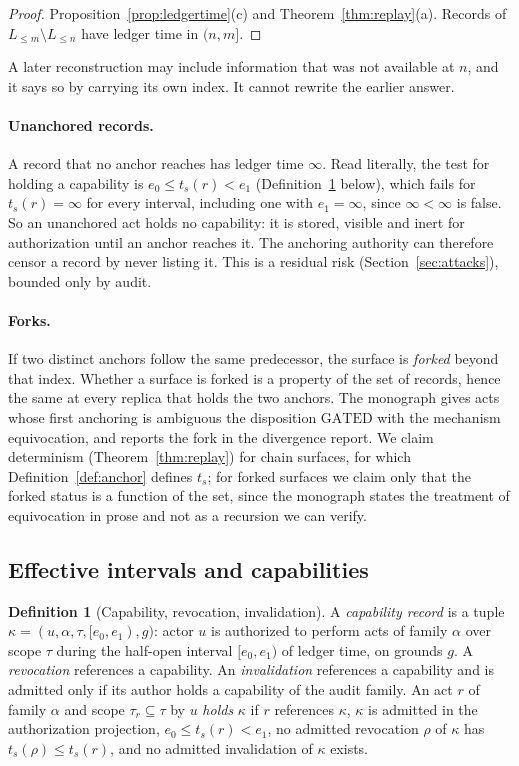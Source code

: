 \documentclass[11pt]{article}
\theoremstyle{plain}
\theoremstyle{definition}
\newtheorem{definition}[theorem]{Definition}
\theoremstyle{remark}
\begin{document}
\begin{proof}
Proposition~\ref{prop:ledgertime}(c) and Theorem~\ref{thm:replay}(a). Records of $L_{\le m}\setminus L_{\le n}$ have ledger time in $(n,m]$.
\end{proof}

A later reconstruction may include information that was not available at $n$, and it says so by carrying its own index. It cannot rewrite the earlier answer.

\paragraph{Unanchored records.} A record that no anchor reaches has ledger time $\infty$. Read literally, the test for holding a capability is $e_0\le t_s(r)<e_1$ (Definition~\ref{def:capability} below), which fails for $t_s(r)=\infty$ for every interval, including one with $e_1=\infty$, since $\infty<\infty$ is false. So an unanchored act holds no capability: it is stored, visible and inert for authorization until an anchor reaches it. The anchoring authority can therefore censor a record by never listing it. This is a residual risk (Section~\ref{sec:attacks}), bounded only by audit.

\paragraph{Forks.} If two distinct anchors follow the same predecessor, the surface is \emph{forked} beyond that index. Whether a surface is forked is a property of the set of records, hence the same at every replica that holds the two anchors. The monograph gives acts whose first anchoring is ambiguous the disposition $\mathrm{GATED}$ with the mechanism \textsf{equivocation}, and reports the fork in the divergence report. We claim determinism (Theorem~\ref{thm:replay}) for chain surfaces, for which Definition~\ref{def:anchor} defines $t_s$; for forked surfaces we claim only that the forked status is a function of the set, since the monograph states the treatment of equivocation in prose and not as a recursion we can verify.

\subsection{Effective intervals and capabilities}

\begin{definition}[Capability, revocation, invalidation]\label{def:capability}
A \emph{capability record} is a tuple $\kappa=(u,\alpha,\tau,[e_0,e_1),g)$: actor $u$ is authorized to perform acts of family $\alpha$ over scope $\tau$ during the half-open interval $[e_0,e_1)$ of ledger time, on grounds $g$. A \emph{revocation} references a capability. An \emph{invalidation} references a capability and is admitted only if its author holds a capability of the audit family. An act $r$ of family $\alpha$ and scope $\tau_r\subseteq\tau$ by $u$ \emph{holds} $\kappa$ if $r$ references $\kappa$, $\kappa$ is admitted in the authorization projection, $e_0\le t_s(r)<e_1$, no admitted revocation $\rho$ of $\kappa$ has $t_s(\rho)\le t_s(r)$, and no admitted invalidation of $\kappa$ exists.
\end{definition}
\end{document}
